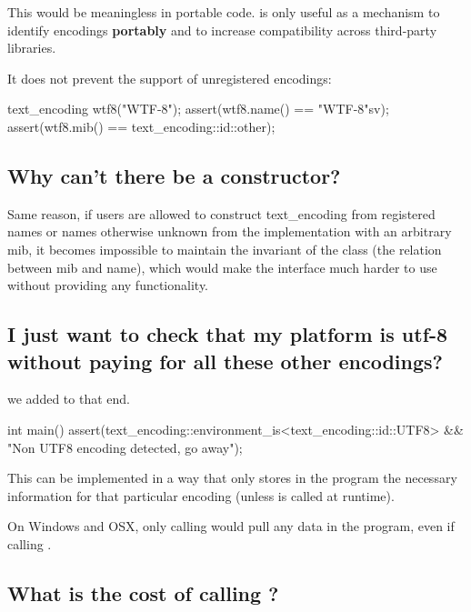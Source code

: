 \documentclass{wg21}
\begin{document}
This would be meaningless in portable code.  is only useful as a mechanism to identify encodings \textbf{portably} and to increase compatibility across third-party libraries.

It does not prevent the support of unregistered encodings:

\begin{colorblock}
    text_encoding wtf8("WTF-8");
    assert(wtf8.name() == "WTF-8"sv);
    assert(wtf8.mib() == text_encoding::id::other);
\end{colorblock}


\subsection{Why can't there be a  constructor?}

Same reason, if users are allowed to construct text_encoding from registered names or names otherwise
unknown from the implementation with an arbitrary mib, it becomes impossible to maintain the invariant of the class
(the relation between mib and name), which would make the interface much harder to use without providing any functionality.

\subsection{I just want to check that my platform is utf-8 without paying for all these other encodings?}

we added  to that end.

\begin{colorblock}[style=MY]
    int main() {
        assert(text_encoding::environment_is<text_encoding::id::UTF8>
                  && "Non UTF8 encoding detected, go away");
    }
\end{colorblock}


This can be implemented in a way that only stores in the program the necessary information for that particular encoding (unless  is called at runtime).

On Windows and OSX, only calling  would pull any data in the program, even if calling .


\subsection{What is the cost of calling ?}
\end{document}
